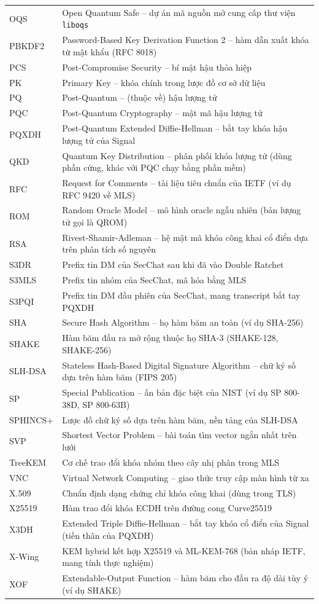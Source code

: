 \begin{longtable}{p{2.7cm} p{12.3cm}}
OQS & Open Quantum Safe -- dự án mã nguồn mở cung cấp thư viện \texttt{liboqs} \\
PBKDF2 & Password-Based Key Derivation Function 2 -- hàm dẫn xuất khóa từ mật khẩu (RFC 8018) \\
PCS & Post-Compromise Security -- bí mật hậu thỏa hiệp \\
PK & Primary Key -- khóa chính trong lược đồ cơ sở dữ liệu \\
PQ & Post-Quantum -- (thuộc về) hậu lượng tử \\
PQC & Post-Quantum Cryptography -- mật mã hậu lượng tử \\
PQXDH & Post-Quantum Extended Diffie-Hellman -- bắt tay khóa hậu lượng tử của Signal \\
QKD & Quantum Key Distribution -- phân phối khóa lượng tử (dùng phần cứng, khác với PQC chạy bằng phần mềm) \\
RFC & Request for Comments -- tài liệu tiêu chuẩn của IETF (ví dụ RFC 9420 về MLS) \\
ROM & Random Oracle Model -- mô hình oracle ngẫu nhiên (bản lượng tử gọi là QROM) \\
RSA & Rivest-Shamir-Adleman -- hệ mật mã khóa công khai cổ điển dựa trên phân tích số nguyên \\
S3DR & Prefix tin DM của SecChat sau khi đã vào Double Ratchet \\
S3MLS & Prefix tin nhóm của SecChat, mã hóa bằng MLS \\
S3PQI & Prefix tin DM đầu phiên của SecChat, mang transcript bắt tay PQXDH \\
SHA & Secure Hash Algorithm -- họ hàm băm an toàn (ví dụ SHA-256) \\
SHAKE & Hàm băm đầu ra mở rộng thuộc họ SHA-3 (SHAKE-128, SHAKE-256) \\
SLH-DSA & Stateless Hash-Based Digital Signature Algorithm -- chữ ký số dựa trên hàm băm (FIPS 205) \\
SP & Special Publication -- ấn bản đặc biệt của NIST (ví dụ SP 800-38D, SP 800-63B) \\
SPHINCS+ & Lược đồ chữ ký số dựa trên hàm băm, nền tảng của SLH-DSA \\
SVP & Shortest Vector Problem -- bài toán tìm vector ngắn nhất trên lưới \\
TreeKEM & Cơ chế trao đổi khóa nhóm theo cây nhị phân trong MLS \\
VNC & Virtual Network Computing -- giao thức truy cập màn hình từ xa \\
X.509 & Chuẩn định dạng chứng chỉ khóa công khai (dùng trong TLS) \\
X25519 & Hàm trao đổi khóa ECDH trên đường cong Curve25519 \\
X3DH & Extended Triple Diffie-Hellman -- bắt tay khóa cổ điển của Signal (tiền thân của PQXDH) \\
X-Wing & KEM hybrid kết hợp X25519 và ML-KEM-768 (bản nháp IETF, mang tính thực nghiệm) \\
XOF & Extendable-Output Function -- hàm băm cho đầu ra độ dài tùy ý (ví dụ SHAKE) \\
\hline
\end{longtable}
